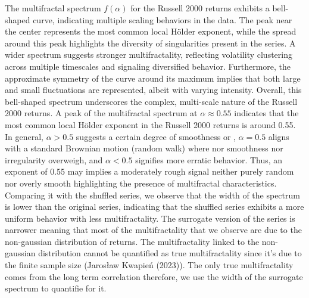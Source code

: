\documentclass[11pt]{extarticle}
\begin{document}
The multifractal spectrum $f(\alpha)$ for the Russell 2000 returns exhibits a bell-shaped curve,
indicating multiple scaling behaviors in the data. The peak near the center represents the most common local Hölder
exponent, while the spread around this peak highlights the diversity of singularities present in the series. A wider
spectrum suggests stronger multifractality, reflecting volatility clustering across multiple timescales and signaling diversified
behavior. Furthermore,
the approximate symmetry of the curve around its maximum implies that both large and small fluctuations are represented,
albeit with varying intensity. Overall, this bell-shaped spectrum underscores the complex, multi-scale nature of the
Russell 2000 returns.
A peak of the multifractal spectrum at $\alpha \approx 0.55$ indicates that the most common local Hölder exponent
in the Russell 2000 returns is around 0.55. In general, $\alpha > 0.5$ suggests a certain degree of smoothness or
, $\alpha = 0.5$ aligns with a standard Brownian motion (random walk) where nor smoothness nor irregularity overweigh,
and $\alpha < 0.5$ signifies more erratic behavior. Thus, an exponent of 0.55 may implies a
moderately rough signal neither purely random nor overly smooth highlighting the presence of multifractal characteristics.
Comparing it with the shuffled series, we observe that the width of the spectrum is lower than the original series, indicating that the
shuffled series exhibits a more uniform behavior with less multifractality. The surrogate version of the series is narrower
meaning that most of the multifractality that we observe are due to the non-gaussian distribution of returns. The multifractality linked to
the non-gaussian distribution cannot be quantified as true multifractality since it's due to the finite sample size (Jarosław Kwapień (2023)).
The only true multifractality comes from the long term correlation therefore, we use the width of the surrogate spectrum to quantifie for it.
\end{document}
